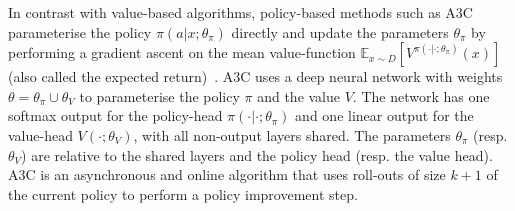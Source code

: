 \documentclass{article}
\begin{document}
 \label{sec:A3Cimplementation}
 In contrast with value-based algorithms, policy-based methods such as A3C~\citep{mnih2016asynchronous} parameterise the policy $\pi(a|x;\theta_\pi)$ directly and update the parameters $\theta_\pi$ by performing a gradient ascent on the mean value-function $\mathbb{E}_{x\sim D}[V^{\pi(\cdot|\cdot;\theta_\pi)}(x)]$ (also called the expected return)~\citep{sutton1999policy}. A3C uses a deep neural network  with weights $\theta=\theta_\pi\cup\theta_V$ to parameterise the policy $\pi$ and the value $V$. The network has one softmax output for the policy-head $\pi(\cdot|\cdot;\theta_\pi)$ and one linear output for the value-head $V(\cdot;\theta_V)$, with all non-output layers shared. The parameters $\theta_\pi$ (resp. $\theta_V$) are relative to the shared layers and the policy head (resp. the value head). A3C is an asynchronous and online algorithm that uses roll-outs of size $k+1$ of the current policy to perform a policy improvement step. 
\end{document}
